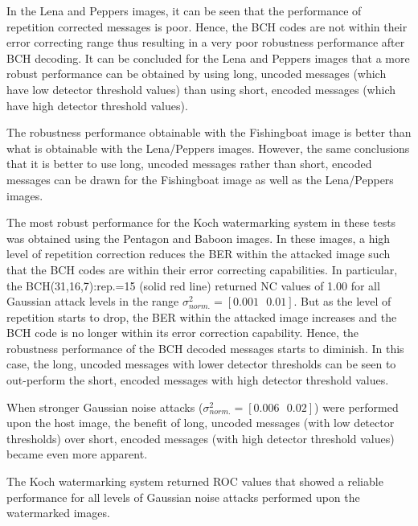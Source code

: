 \documentclass[12pt]{report}
\begin{document}
In the Lena and Peppers images, it can be seen that the performance of repetition
corrected messages is poor. Hence, the BCH codes are not within their error correcting range thus resulting in a very
poor robustness performance after BCH decoding. It can be concluded 
for the Lena and Peppers images that
a more robust performance can be obtained by using long, uncoded messages (which have low detector threshold values) than using short, encoded 
messages (which have high detector threshold values).

The robustness performance obtainable with the Fishingboat image
is better than what is obtainable with the Lena/Peppers images. However, the same conclusions 
that it is better to use long, uncoded messages rather than short, encoded messages can be drawn for the Fishingboat
image as well as the Lena/Peppers images.

The most robust performance for the Koch watermarking system in these tests was obtained using the Pentagon and
Baboon images. In these images, a high level of repetition correction reduces the BER within the attacked image such that 
the BCH codes are within their error correcting capabilities. In particular, the BCH(31,16,7):rep.=15 (solid red line)
returned NC values of 1.00 for all Gaussian attack levels in the range $\sigma_{norm.}^{2} = [0.001 \mbox{ } 0.01]$.
But as the level of repetition starts to drop, the BER within the attacked image increases and the BCH 
code is no longer within its error correction capability. Hence, the robustness performance of the 
BCH decoded messages starts to diminish.
In this case, the long, uncoded messages with lower detector thresholds 
can be seen to out-perform the short, encoded messages with high detector threshold values.

When stronger Gaussian noise attacks ($\sigma_{norm.}^{2}=[0.006 \mbox{ } 0.02]$) were performed upon the host image,
the benefit of long, uncoded messages (with low detector thresholds) over short, encoded messages (with high detector threshold values)
became even more apparent.

The Koch watermarking system returned ROC values that showed a reliable performance for all levels of Gaussian noise attacks
performed upon the watermarked images.
\end{document}
